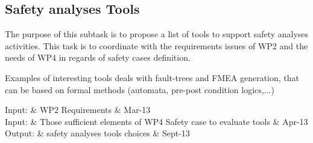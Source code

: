 \documentclass{template/openetcs_article}
\begin{document}
%
% 
%

\subsection{Safety analyses Tools}


The purpose of this subtask is to propose a list of tools to  support  safety  analyses activities. This task  is to  coordinate with  the requirements issues of WP2 and the needs of WP4 in regards of safety cases definition.

Examples of interesting tools deals with fault-trees and FMEA generation, that can be based on formal methods (automata, pre-post condition logics,...) 
  
 
\begin{inoutput}
Input: & WP2 Requirements & Mar-13 \\
Input: & Those sufficient elements of WP4 Safety case to evaluate tools & Apr-13 \\
\hline
Output: & safety analyses tools choices & Sept-13 \\
\end{inoutput}



\end{document}
